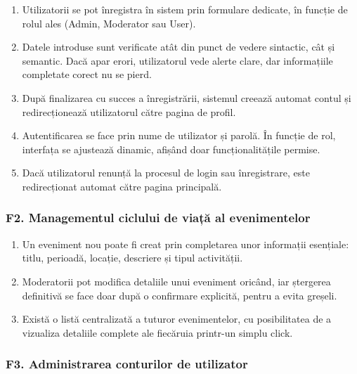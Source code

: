 \documentclass[a4paper,12pt,oneside]{report}
\begin{document}
\begin{enumerate}[label=\textbf{F1.\arabic*}]
    \item Utilizatorii se pot înregistra în sistem prin formulare dedicate, în funcție de rolul ales (Admin, Moderator sau User).
    
    \item Datele introduse sunt verificate atât din punct de vedere sintactic, cât și semantic. Dacă apar erori, utilizatorul vede alerte clare, dar informațiile completate corect nu se pierd.
    
    \item După finalizarea cu succes a înregistrării, sistemul creează automat contul și redirecționează utilizatorul către pagina de profil.
    
    \item Autentificarea se face prin nume de utilizator și parolă. În funcție de rol, interfața se ajustează dinamic, afișând doar funcționalitățile permise.
    
    \item Dacă utilizatorul renunță la procesul de login sau înregistrare, este redirecționat automat către pagina principală.
\end{enumerate}

\subsubsection*{F2. Managementul ciclului de viață al evenimentelor}

\begin{enumerate}[label=\textbf{F2.\arabic*}]
    \item Un eveniment nou poate fi creat prin completarea unor informații esențiale: titlu, perioadă, locație, descriere și tipul activității.
    
    \item Moderatorii pot modifica detaliile unui eveniment oricând, iar ștergerea definitivă se face doar după o confirmare explicită, pentru a evita greșeli.
    
    \item Există o listă centralizată a tuturor evenimentelor, cu posibilitatea de a vizualiza detaliile complete ale fiecăruia printr-un simplu click.
\end{enumerate}

\subsubsection*{F3. Administrarea conturilor de utilizator}
\end{document}
